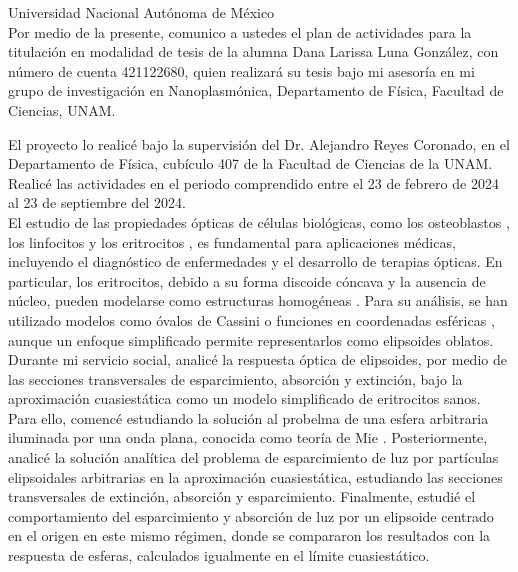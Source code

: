 \documentclass[9pt,letterpaper]{article}
\begin{document}
	Universidad Nacional Autónoma de México\\
	
	Por medio de la presente, comunico a ustedes el plan de actividades para la titulación en modalidad de tesis de la alumna Dana Larissa Luna González, con número de cuenta 421122680, quien realizará su tesis bajo mi asesoría en mi grupo de investigación en Nanoplasmónica, Departamento de Física, Facultad de Ciencias, UNAM.
	
	
	 El proyecto lo realicé bajo la supervisión del Dr. Alejandro Reyes Coronado, en el Departamento de Física, cubículo 407 de la Facultad de Ciencias de la UNAM. Realicé las actividades en el periodo comprendido entre el 23 de febrero de 2024 al 23 de septiembre del 2024. \\
	
	El estudio de las propiedades ópticas de células biológicas, como los osteoblastos \cite{Osteoblastos}, los linfocitos \cite{Linfocitos} y los eritrocitos \cite{Blood}, es fundamental para aplicaciones médicas, incluyendo el diagnóstico de enfermedades y el desarrollo de terapias ópticas. En particular, los eritrocitos, debido a su forma discoide cóncava y la ausencia de núcleo, pueden modelarse como estructuras homogéneas \cite{Cassini}. Para su análisis, se han utilizado modelos como óvalos de Cassini \cite{Cassini} o funciones en coordenadas esféricas \cite{Esferico}, aunque un enfoque simplificado permite representarlos como elipsoides oblatos.\\
	
	Durante mi servicio social, analicé la respuesta óptica de elipsoides, por medio de las secciones transversales de esparcimiento, absorción y extinción, bajo la aproximación cuasiestática como un modelo simplificado de eritrocitos sanos. Para ello, comencé estudiando la solución al probelma de una esfera arbitraria iluminada por una onda plana, conocida como teoría de Mie \cite{Bohren}. Posteriormente, analicé la solución analítica del problema de esparcimiento de luz por partículas elipsoidales arbitrarias en la aproximación cuasiestática, estudiando las secciones transversales de extinción, absorción y esparcimiento. Finalmente, estudié el comportamiento del esparcimiento y absorción de luz por un elipsoide centrado en el origen en este mismo régimen, donde se compararon los resultados con la respuesta de esferas, calculados igualmente en el límite cuasiestático.\\
	
\end{document}
